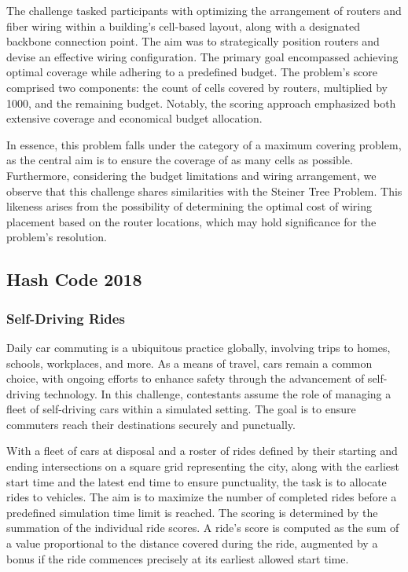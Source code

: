 The challenge tasked participants with optimizing the arrangement of routers and
fiber wiring within a building's cell-based layout, along with a designated
backbone connection point. The aim was to strategically position routers and
devise an effective wiring configuration. The primary goal encompassed achieving
optimal coverage while adhering to a predefined budget. The problem's score
comprised two components: the count of cells covered by routers, multiplied by
1000, and the remaining budget. Notably, the scoring approach emphasized both
extensive coverage and economical budget allocation.

In essence, this problem falls under the category of a maximum covering problem,
as the central aim is to ensure the coverage of as many cells as possible.
Furthermore, considering the budget limitations and wiring arrangement, we
observe that this challenge shares similarities with the Steiner Tree Problem.
This likeness arises from the possibility of determining the optimal cost of
wiring placement based on the router locations, which may hold significance for the
problem's resolution.

\subsection{Hash Code 2018}
\label{subsec:hashcode-2018}

\subsubsection*{Self-Driving Rides}
\label{subsubsec:hashcode-2018-qualification}

Daily car commuting is a ubiquitous practice globally, involving trips to homes,
schools, workplaces, and more. As a means of travel, cars remain a common
choice, with ongoing efforts to enhance safety through the advancement of
self-driving technology. In this challenge, contestants assume the role of
managing a fleet of self-driving cars within a simulated setting. The goal is to
ensure commuters reach their destinations securely and punctually.

With a fleet of cars at disposal and a roster of rides defined by their starting
and ending intersections on a square grid representing the city, along with the
earliest start time and the latest end time to ensure punctuality, the task is
to allocate rides to vehicles. The aim is to maximize the number of completed
rides before a predefined simulation time limit is reached. The scoring is
determined by the summation of the individual ride scores. A ride's score is
computed as the sum of a value proportional to the distance covered during the
ride, augmented by a bonus if the ride commences precisely at its earliest
allowed start time.

